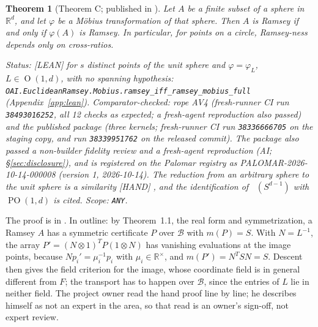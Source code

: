 \documentclass[11pt]{amsart}
\newcommand{\st}[1]{\textsf{[#1]}}
\newcommand{\R}{\mathbb{R}}
\newcommand{\BB}{\mathscr{B}}
\DeclareMathOperator{\PO}{PO}
\DeclareMathOperator{\Ort}{O}
\DeclareMathOperator{\Mob}{M\ddot{o}b}
\theoremstyle{plain}
\newtheorem{theorem}{Theorem}[section]
\theoremstyle{definition}
\begin{document}
\begin{theorem}[Theorem C; published in \cite{MR}]\label{thm:C}
Let $A$ be a finite subset of a sphere in $\R^d$, and let $\varphi$ be a M\"obius transformation of
that sphere. Then $A$ is Ramsey if and only if $\varphi(A)$ is Ramsey. In particular, for points on
a circle, Ramsey-ness depends only on cross-ratios.

\smallskip\noindent\emph{Status:} \st{LEAN} for $s$ distinct points of the unit sphere and
$\varphi=\varphi_L$, $L\in\Ort(1,d)$, with no spanning hypothesis:
\texttt{OAI.EuclideanRamsey.Mobius.}\allowbreak\texttt{ramsey\_iff\_ramsey\_mobius\_full}
(Appendix~\ref{app:lean}). Comparator-checked: rope AV4 (fresh-runner CI run
\texttt{38493016252}, all 12 checks as expected; a fresh-agent reproduction also passed) and the
published package \cite{MR} (three kernels; fresh-runner CI run \texttt{38336666705} on the staging copy, and run
\texttt{38339951762} on the released commit). The package also passed a non-builder fidelity
review and a fresh-agent reproduction (AI; \S\ref{sec:disclosure}), and is registered on the
Palomar registry as PALOMAR-2026-10-14-000008 (version 1, 2026-10-14). The reduction from an arbitrary
sphere to the unit sphere is a similarity \st{HAND} \cite[Remark~1]{MR}, and the identification of
$\Mob(S^{d-1})$ with $\PO(1,d)$ is cited. Scope: \texttt{ANY}.
\end{theorem}

The proof is in \cite[\S2]{MR}. In outline: by Theorem~1.1, the real form and symmetrization, a
Ramsey $A$ has a symmetric certificate $P$ over $\BB$ with $m(P)=S$. With $N=L^{-1}$, the array
$P'=(N\otimes1)^TP(1\otimes N)$ has vanishing evaluations at the image points, because
$Np_i'=\mu_i^{-1}p_i$ with $\mu_i\in\R^\times$, and $m(P')=N^TSN=S$. Descent then gives the field
criterion for the image, whose coordinate field is in general different from $F$; the transport has
to happen over $\BB$, since the entries of $L$ lie in neither field. The project owner read the
hand proof line by line; he describes himself as not an expert in the area, so that read is an
owner's sign-off, not expert review.
\end{document}
